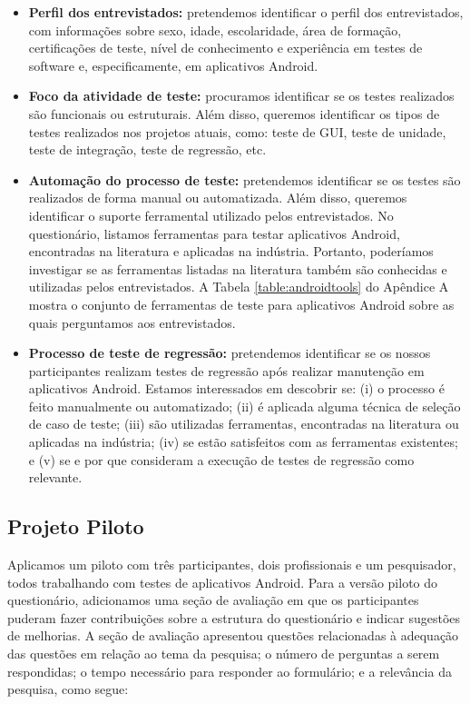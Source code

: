 \begin{itemize}
    \item \textbf{Perfil dos entrevistados:} pretendemos identificar o perfil dos entrevistados, com informações sobre sexo, idade, escolaridade, área de formação, certificações de teste, nível de conhecimento e experiência em testes de software e, especificamente, em aplicativos Android.
    
    \item \textbf{Foco da atividade de teste:} procuramos identificar se os testes realizados são funcionais ou estruturais. Além disso, queremos identificar os tipos de testes realizados nos projetos atuais, como: teste de \ac{GUI}, teste de unidade, teste de integração, teste de regressão, etc.
    
    \item \textbf{Automação do processo de teste:} pretendemos identificar se os testes são realizados de forma manual ou automatizada. Além disso, queremos identificar o suporte ferramental utilizado pelos entrevistados. No questionário, listamos ferramentas para testar aplicativos Android, encontradas na literatura e aplicadas na indústria. Portanto, poderíamos investigar se as ferramentas listadas na literatura também são conhecidas e utilizadas pelos entrevistados. A Tabela \ref{table:androidtools} do Apêndice A mostra o conjunto de ferramentas de teste para aplicativos Android sobre as quais perguntamos aos entrevistados.
    
    \item \textbf{Processo de teste de regressão:} pretendemos identificar se os nossos participantes realizam testes de regressão após realizar manutenção em aplicativos Android. Estamos interessados em descobrir se: (i) o processo é feito manualmente ou automatizado; (ii) é aplicada alguma técnica de seleção de caso de teste; (iii) são utilizadas ferramentas, encontradas na literatura ou aplicadas na indústria; (iv) se estão satisfeitos com as ferramentas existentes; e (v) se e por que consideram a execução de testes de regressão como relevante.
    
\end{itemize}

\subsection{Projeto Piloto}

Aplicamos um piloto com três participantes, dois profissionais e um pesquisador, todos trabalhando com testes de aplicativos Android. Para a versão piloto do questionário, adicionamos uma seção de avaliação em que os participantes puderam fazer contribuições sobre a estrutura do questionário e indicar sugestões de melhorias. A seção de avaliação apresentou questões relacionadas à adequação das questões em relação ao tema da pesquisa; o número de perguntas a serem respondidas; o tempo necessário para responder ao formulário; e a relevância da pesquisa, como segue:


